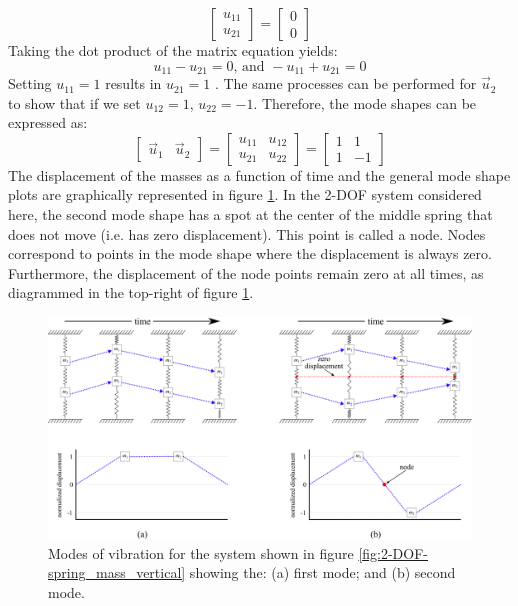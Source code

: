 \documentclass[12pt,letter]{article}
\begin{document}
\begin{example}
\begin{equation}
		 \begin{bmatrix} u_{11}\\ u_{21}\end{bmatrix}=\begin{bmatrix} 0\\ 0\end{bmatrix}
	\end{equation}
	Taking the dot product of the matrix equation yields:
	\begin{equation}
		u_{11} - u_{21}=0 \text{, and } - u_{11} + u_{21}=0
	\end{equation}
	Setting $u_{11} = 1$ results in $u_{21} = 1$ . The same processes can be performed for $\vec{u}_2$ to show that if we set $u_{12} = 1$, $u_{22} = -1$. Therefore, the mode shapes can be expressed as:
	\begin{equation}
		 \begin{bmatrix} \vec{u}_1 & \vec{u}_2 \end{bmatrix} = \begin{bmatrix}  u_{11} & u_{12} \\ u_{21} & u_{22} \end{bmatrix} = \begin{bmatrix}  1 & 1 \\ 1 & -1 \end{bmatrix}
	\end{equation}
	The displacement of the masses as a function of time and the general mode shape plots are graphically represented in figure \ref{fig:2-DOF_mode_shape}. In the 2-DOF system considered here, the second mode shape has a spot at the center of the middle spring that does not move (i.e. has zero displacement). This point is called a node. Nodes correspond to points in the mode shape where the displacement is always zero. Furthermore, the displacement of the node points remain zero at all times, as diagrammed in the top-right of figure \ref{fig:2-DOF_mode_shape}.
	
	\begin{figure}[H]
		\centering
		\includegraphics[width=\linewidth]{../figures/2-DOF_mode_shape.png}
		\caption{Modes of vibration for the system shown in figure \ref{fig:2-DOF-spring_mass_vertical} showing the: (a) first mode; and (b) second mode.}
		\label{fig:2-DOF_mode_shape}
	\end{figure}
	\end{example}
	
\end{document}
